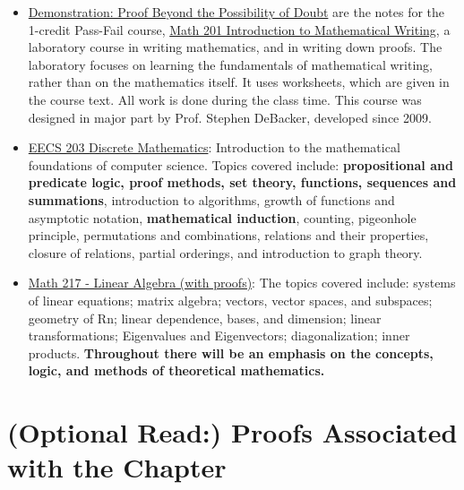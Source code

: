 \begin{itemize}
    \item \href{https://dept.math.lsa.umich.edu/~smdbackr/MATH/Mathematical_Writing_A_Primer.pdf}{Demonstration: Proof Beyond the Possibility of Doubt} are the notes for the 1-credit Pass-Fail course, \href{https://dept.math.lsa.umich.edu/~lagarias/m201-21fa.html}{Math 201 Introduction to Mathematical Writing}, a laboratory course in writing mathematics, and in writing down proofs. The laboratory focuses on learning the fundamentals of mathematical writing, rather than on the mathematics itself. It uses worksheets, which are given in the course text. All work is done during the class time. This course was designed in major part by Prof. Stephen DeBacker, developed since 2009.
    \item \href{https://ece.engin.umich.edu/academics/course-information/course-descriptions/eecs-203/}{EECS 203 Discrete Mathematics}: Introduction to the mathematical foundations of computer science. Topics covered include: \textbf{propositional and predicate logic, proof methods, set theory, functions, sequences and summations}, introduction to algorithms, growth of functions and asymptotic notation, \textbf{mathematical induction}, counting, pigeonhole principle, permutations and combinations, relations and their properties, closure of relations, partial orderings, and introduction to graph theory.
    \item \href{https://lsa.umich.edu/math/undergraduates/undergraduate-math-courses/200-level-math-courses.html}{Math 217 - Linear Algebra (with proofs)}: The topics covered include: systems of linear equations; matrix algebra; vectors, vector spaces, and subspaces; geometry of Rn; linear dependence, bases, and dimension; linear transformations; Eigenvalues and Eigenvectors; diagonalization; inner products. \textbf{Throughout there will be an emphasis on the concepts, logic, and methods of theoretical mathematics.}
\end{itemize}




\section{(Optional Read:) Proofs Associated with the Chapter}
\label{sec:ProofsChap02}

\bigskip



